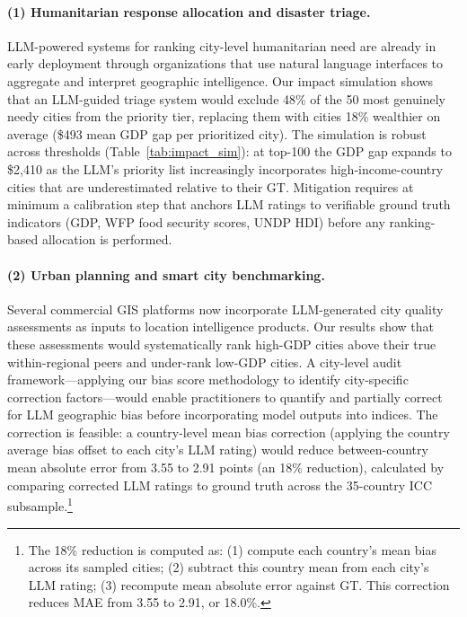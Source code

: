 \documentclass[12pt]{article}
\begin{document}
\paragraph{(1) Humanitarian response allocation and disaster triage.} LLM-powered systems for ranking city-level humanitarian need are already in early deployment through organizations that use natural language interfaces to aggregate and interpret geographic intelligence. Our impact simulation shows that an LLM-guided triage system would exclude 48\% of the 50 most genuinely needy cities from the priority tier, replacing them with cities 18\% wealthier on average (\$493 mean GDP gap per prioritized city). The simulation is robust across thresholds (Table~\ref{tab:impact_sim}): at top-100 the GDP gap expands to \$2,410 as the LLM's priority list increasingly incorporates high-income-country cities that are underestimated relative to their GT. Mitigation requires at minimum a calibration step that anchors LLM ratings to verifiable ground truth indicators (GDP, WFP food security scores, UNDP HDI) before any ranking-based allocation is performed.

\paragraph{(2) Urban planning and smart city benchmarking.} Several commercial GIS platforms now incorporate LLM-generated city quality assessments as inputs to location intelligence products. Our results show that these assessments would systematically rank high-GDP cities above their true within-regional peers and under-rank low-GDP cities. A city-level audit framework---applying our bias score methodology to identify city-specific correction factors---would enable practitioners to quantify and partially correct for LLM geographic bias before incorporating model outputs into indices. The correction is feasible: a country-level mean bias correction (applying the country average bias offset to each city's LLM rating) would reduce between-country mean absolute error from 3.55 to 2.91 points (an 18\% reduction), calculated by comparing corrected LLM ratings to ground truth across the 35-country ICC subsample.\footnote{The 18\% reduction is computed as: (1) compute each country's mean bias across its sampled cities; (2) subtract this country mean from each city's LLM rating; (3) recompute mean absolute error against GT. This correction reduces MAE from 3.55 to 2.91, or 18.0\%.}
\end{document}
